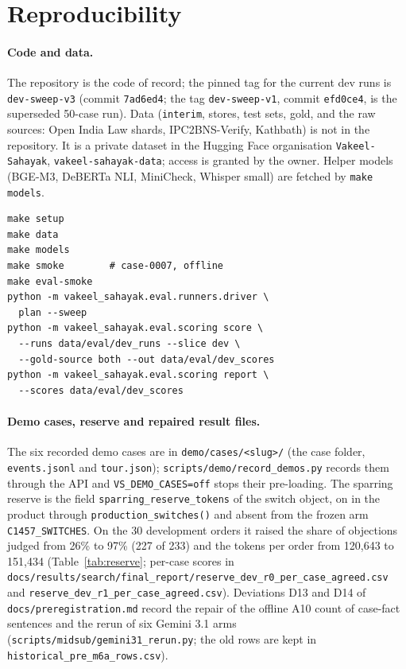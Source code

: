 \section{Reproducibility}
\label{app:repro}

\paragraph{Code and data.} The repository is the code of record; the pinned tag for the current dev runs is \texttt{dev-sweep-v3} (commit \texttt{7ad6ed4}; the tag \texttt{dev-sweep-v1}, commit \texttt{efd0ce4}, is the superseded 50-case run). Data (\texttt{interim}, stores, test sets, gold, and the raw sources: Open India Law shards, IPC2BNS-Verify, Kathbath) is not in the repository. It is a private dataset in the Hugging Face organisation \texttt{Vakeel-Sahayak}, \texttt{vakeel-sahayak-data}; access is granted by the owner. Helper models (BGE-M3, DeBERTa NLI, MiniCheck, Whisper small) are fetched by \texttt{make models}.

{\footnotesize\begin{verbatim}
make setup
make data
make models
make smoke        # case-0007, offline
make eval-smoke
python -m vakeel_sahayak.eval.runners.driver \
  plan --sweep
python -m vakeel_sahayak.eval.scoring score \
  --runs data/eval/dev_runs --slice dev \
  --gold-source both --out data/eval/dev_scores
python -m vakeel_sahayak.eval.scoring report \
  --scores data/eval/dev_scores
\end{verbatim}}

\paragraph{Demo cases, reserve and repaired result files.} The six recorded demo cases are in \texttt{demo/cases/<slug>/} (the case folder, \texttt{events.jsonl} and \texttt{tour.json}); \texttt{scripts/demo/record\_demos.py} records them through the API and \texttt{VS\_DEMO\_CASES=off} stops their pre-loading. The sparring reserve is the field \texttt{sparring\_reserve\_tokens} of the switch object, on in the product through \texttt{production\_switches()} and absent from the frozen arm \texttt{C1457\_SWITCHES}. On the 30 development orders it raised the share of objections judged from 26\% to 97\% (227 of 233) and the tokens per order from 120{,}643 to 151{,}434 (Table~\ref{tab:reserve}; per-case scores in \texttt{docs/results/search/\allowbreak final\_report/\allowbreak reserve\_dev\_r0\_per\_case\_agreed.csv} and \texttt{reserve\_dev\_r1\_per\_case\_agreed.csv}). Deviations D13 and D14 of \texttt{docs/preregistration.md} record the repair of the offline A10 count of case-fact sentences and the rerun of six Gemini 3.1 arms (\texttt{scripts/midsub/gemini31\_rerun.py}; the old rows are kept in \texttt{historical\_pre\_m6a\_rows.csv}).

